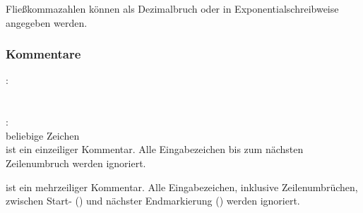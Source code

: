 Fließkommazahlen können als Dezimalbruch oder in Exponentialschreibweise
angegeben werden.


\subsubsection{Kommentare}\label{Kommentare}
:\label{COMMENT}\\
\hspace*{1cm}\glq\Gt{//}\grq  \glq{}\grq \\
\hspace*{1cm}\glq\Gt{//}\grq  \glq{}\grq \\
:\label{ML_COMMENT}\\
\hspace*{1cm}\glq\kwMlcStart\grq beliebige Zeichen \glq\kwMlcEnd\grq\\

 ist ein einzeiliger Kommentar. Alle Eingabezeichen bis zum nächsten Zeilenumbruch
werden ignoriert.

 ist ein mehrzeiliger Kommentar. Alle Eingabezeichen, inklusive Zeilenumbrüchen,
zwischen Start- (\kwMlcStart) und nächster Endmarkierung (\kwMlcEnd) werden ignoriert.

